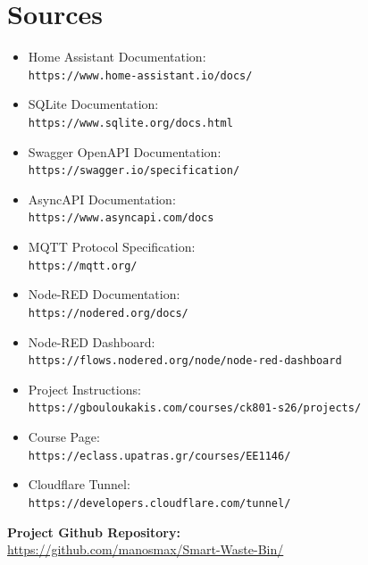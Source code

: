 \documentclass[10pt,a4paper]{article}
\begin{document}
\section*{Sources}

\begin{itemize}
\item Home Assistant Documentation: \\
\texttt{https://www.home-assistant.io/docs/}

\item SQLite Documentation: \\
\texttt{https://www.sqlite.org/docs.html}

\item Swagger OpenAPI Documentation: \\
\texttt{https://swagger.io/specification/}

\item AsyncAPI Documentation: \\
\texttt{https://www.asyncapi.com/docs}

\item MQTT Protocol Specification: \\
\texttt{https://mqtt.org/}

\item Node-RED Documentation: \\
\texttt{https://nodered.org/docs/}

\item Node-RED Dashboard: \\
\texttt{https://flows.nodered.org/node/node-red-dashboard}

\item Project Instructions: \\
\texttt{https://gbouloukakis.com/courses/ck801-s26/projects/}

\item Course Page: \\
\texttt{https://eclass.upatras.gr/courses/EE1146/}

\item Cloudflare Tunnel: \\
\texttt{https://developers.cloudflare.com/tunnel/}
\end{itemize}

\textbf{Project Github Repository:}\\[2pt] \url{https://github.com/manosmax/Smart-Waste-Bin/}\\[2pt]
\end{document}
